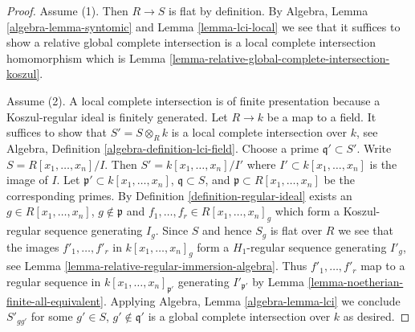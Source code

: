 \documentclass[10pt,a4paper]{amsart}
\theoremstyle{plain}
\theoremstyle{definition}
\theoremstyle{remark}
\numberwithin{equation}{subsection}
\begin{document}
\begin{proof}
Assume (1). Then $R \to S$ is flat by definition.
By Algebra, Lemma \ref{algebra-lemma-syntomic} and
Lemma \ref{lemma-lci-local} we see that it suffices to
show a relative global complete intersection is
a local complete intersection homomorphism which is
Lemma \ref{lemma-relative-global-complete-intersection-koszul}.

\medskip\noindent
Assume (2). A local complete intersection is of finite presentation
because a Koszul-regular ideal is finitely generated.
Let $R \to k$ be a map to a field. It suffices to show that
$S' = S \otimes_R k$ is a local complete intersection over $k$, see
Algebra, Definition \ref{algebra-definition-lci-field}.
Choose a prime $\mathfrak q' \subset S'$.
Write $S = R[x_1, \ldots, x_n]/I$.
Then $S' = k[x_1, \ldots, x_n]/I'$ where
$I' \subset k[x_1, \ldots, x_n]$ is the image of $I$.
Let $\mathfrak p' \subset k[x_1, \ldots, x_n]$,
$\mathfrak q \subset S$,
and $\mathfrak p \subset R[x_1, \ldots, x_n]$
be the corresponding primes.
By Definition \ref{definition-regular-ideal}
exists an $g \in R[x_1, \ldots, x_n]$, $g \not \in \mathfrak p$
and $f_1, \ldots, f_r \in R[x_1, \ldots, x_n]_g$ which form
a Koszul-regular sequence generating $I_g$.
Since $S$ and hence $S_g$ is flat over $R$
we see that the images $f'_1, \ldots, f'_r$ in
$k[x_1, \ldots, x_n]_g$ form a $H_1$-regular sequence
generating $I'_g$, see
Lemma \ref{lemma-relative-regular-immersion-algebra}.
Thus $f'_1, \ldots, f'_r$ map to a regular sequence in
$k[x_1, \ldots, x_n]_{\mathfrak p'}$ generating
$I'_{\mathfrak p'}$ by Lemma \ref{lemma-noetherian-finite-all-equivalent}.
Applying Algebra, Lemma \ref{algebra-lemma-lci}
we conclude $S'_{gg'}$ for some $g' \in S$, $g' \not \in \mathfrak q'$
is a global complete intersection over $k$ as desired.
\end{proof}
\end{document}
